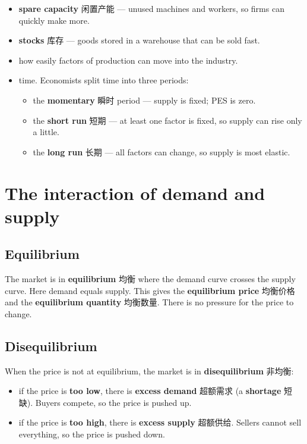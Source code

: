\documentclass[11pt]{article}
\begin{document}
\begin{itemize}
\item \textbf{spare capacity} 闲置产能 — unused machines and workers, so firms can quickly make more.

\item \textbf{stocks} 库存 — goods stored in a warehouse that can be sold fast.

\item how easily factors of production can move into the industry.

\item time. Economists split time into three periods:

\begin{itemize}
\item the \textbf{momentary} 瞬时 period — supply is fixed; PES is zero.

\item the \textbf{short run} 短期 — at least one factor is fixed, so supply can rise only a little.

\item the \textbf{long run} 长期 — all factors can change, so supply is most elastic.

\end{itemize}

\end{itemize}

\section*{The interaction of demand and supply}

\subsection*{Equilibrium}

The market is in \textbf{equilibrium} 均衡 where the demand curve crosses the supply curve. Here demand equals supply. This gives the \textbf{equilibrium price} 均衡价格 and the \textbf{equilibrium quantity} 均衡数量. There is no pressure for the price to change.

\subsection*{Disequilibrium}

When the price is not at equilibrium, the market is in \textbf{disequilibrium} 非均衡:

\begin{itemize}
\item if the price is \textbf{too low}, there is \textbf{excess demand} 超额需求 (a \textbf{shortage} 短缺). Buyers compete, so the price is pushed up.

\item if the price is \textbf{too high}, there is \textbf{excess supply} 超额供给. Sellers cannot sell everything, so the price is pushed down.

\end{itemize}
\end{document}
